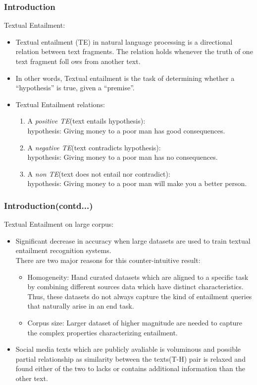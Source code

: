 \documentclass{beamer}
\begin{document}
\begin{frame}\frametitle{Introduction}
Textual Entailment:\\
\begin{itemize}

\item Textual entailment (TE) in natural language processing is a directional relation between text fragments. The relation holds whenever the truth of one text fragment foll																																																								ows from another text.
\item In other words, Textual entailment is the task of determining whether a “hypothesis” is true,
given a “premise”.
\item Textual Entailment relations:
\\ 
\begin{enumerate}
	\item A \textit{positive TE}(text entails hypothesis):
	\\ hypothesis: Giving money to a poor man has good consequences.
	\item A \textit{negative TE}(text contradicts hypothesis):
	\\ hypothesis: Giving money to a poor man has no consequences.
	\item A \textit{non TE}(text does not entail nor contradict):
	\\ hypothesis: Giving money to a poor man will make you a better person.
	
\end{enumerate}
 \end{itemize}
\end{frame}
\begin{frame}\frametitle{Introduction(contd...)}
Textual Entailment on large corpus:\\
	\begin{itemize}		

\item Significant decrease in accuracy when large datasets are used to train textual entailment
recognition systems.\\
There are two major reasons for this
counter-intuitive result:
\begin{itemize}
	\item Homogeneity: Hand curated datasets which are aligned to a specific task by combining different sources data which have distinct characteristics.
	Thus, these datasets do not always capture the kind
	of entailment queries that naturally arise in an end task. 
	\item Corpus size: Larger dataset of higher magnitude are needed to capture the complex properties characterizing entailment. 
\end{itemize}
\item Social media texts which are publicly avaliable is voluminous and possible partial relationship as similarity between the texts(T-H) pair is relaxed and found either of the two to lacks or contains additional information than the other text.	 
 \end{itemize}
\end{frame}
\end{document}
